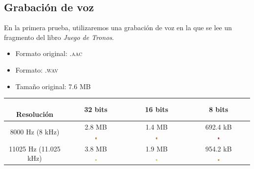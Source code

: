 \documentclass[11pt,a4paper]{article}
\begin{document}
\subsection{Grabación de voz}

En la primera prueba, utilizaremos una grabación de voz en la que se lee un fragmento del libro \textit{Juego de Tronos}.

\begin{itemize}
	\item Formato original: \textsc{.aac}
	\item Formato: \textsc{.wav}
	\item Tamaño original: 7.6 MB
\end{itemize}

\begin{table}[H]
\centering
\begin{tabular}{|c|c|c|c|}
\hline
\diagbox[width=15em]{Frecuencia\\de muestreo}{\\Resolución} & 32 bits & 16 bits & 8 bits  \\ \hline

8000 Hz (8 kHz) & \makecell{2.8 MB\\ \includegraphics[width=0.03\textwidth]{m.png}} & \makecell{1.4 MB\\ \includegraphics[width=0.03\textwidth]{m.png}} & \makecell{692.4 kB\\ \includegraphics[width=0.03\textwidth]{mm.png}} \\ \hline

11025 Hz (11.025 kHz) & \makecell{3.8 MB\\ \includegraphics[width=0.03\textwidth]{r.png}} & \makecell{1.9 MB\\ \includegraphics[width=0.03\textwidth]{r.png}} & \makecell{954.2 kB\\ \includegraphics[width=0.03\textwidth]{m.png}} \\ \hline


\end{tabular}
\end{table}
\end{document}
